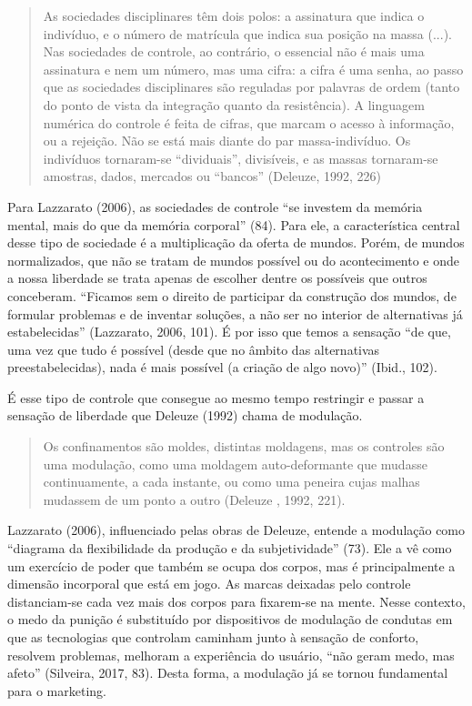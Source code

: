 \begin{quote}
As sociedades disciplinares têm dois polos: a assinatura que indica o
indivíduo, e o número de matrícula que indica sua posição na massa
(...). Nas sociedades de controle, ao contrário, o essencial não é mais
uma assinatura e nem um número, mas uma cifra: a cifra é uma senha, ao
passo que as sociedades disciplinares são reguladas por palavras de
ordem (tanto do ponto de vista da integração quanto da resistência). A
linguagem numérica do controle é feita de cifras, que marcam o acesso à
informação, ou a rejeição. Não se está mais diante do par
massa-indivíduo. Os indivíduos tornaram-se ``dividuais'', divisíveis, e
as massas tornaram-se amostras, dados, mercados ou ``bancos'' (Deleuze,
1992, 226)
\end{quote}

Para Lazzarato (2006),
as sociedades de controle ``se investem da memória mental, mais do que
da memória corporal'' (84). Para ele, a característica central desse
tipo de sociedade é a multiplicação da oferta de mundos. Porém, de
mundos normalizados, que não se tratam de mundos possível ou do
acontecimento e onde a nossa liberdade se trata apenas de escolher
dentre os possíveis que outros conceberam. ``Ficamos sem o direito de
participar da construção dos mundos, de formular problemas e de inventar
soluções, a não ser no interior de alternativas já estabelecidas''
(Lazzarato, 2006, 101).
É por isso que temos a sensação ``de que, uma vez que tudo é possível
(desde que no âmbito das alternativas preestabelecidas), nada é mais
possível (a criação de algo novo)'' (Ibid., 102).

É esse tipo de controle que consegue ao mesmo tempo restringir e passar
a sensação de liberdade que Deleuze (1992) chama de modulação.

\begin{quote}
Os confinamentos são moldes, distintas moldagens, mas os controles são
uma modulação, como uma moldagem auto-deformante que mudasse
continuamente, a cada instante, ou como uma peneira cujas malhas
mudassem de um ponto a outro (Deleuze , 1992, 221).
\end{quote}

Lazzarato (2006), influenciado pelas obras de Deleuze, entende a
modulação como ``diagrama da flexibilidade da produção e da
subjetividade'' (73). Ele a vê como um exercício de poder que também se
ocupa dos corpos, mas é principalmente a dimensão incorporal que está em
jogo. As marcas deixadas pelo controle distanciam-se cada vez mais dos
corpos para fixarem-se na mente. Nesse contexto, o medo da punição é
substituído por dispositivos de modulação de condutas em que as
tecnologias que controlam caminham junto à sensação de conforto,
resolvem problemas, melhoram a experiência do usuário, ``não geram medo,
mas afeto'' (Silveira, 2017, 83). Desta forma, a modulação já se tornou
fundamental para o marketing.

